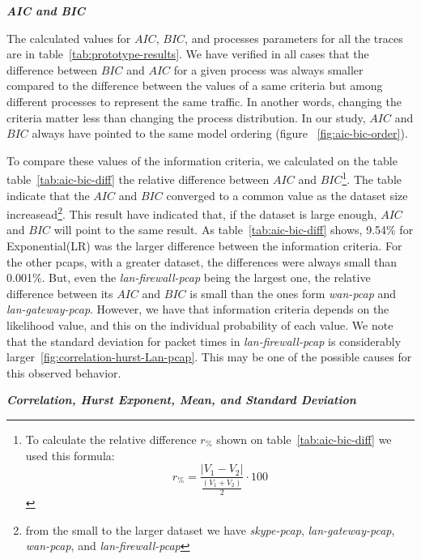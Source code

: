 \smallskip \noindent  \textbf{\textit{AIC and BIC}}

The calculated values for $AIC$, $BIC$, and processes parameters for all the traces are in table~\ref{tab:prototype-results}. We have verified in all cases  that the difference between $BIC$ and $AIC$ for a given process was always smaller compared to the difference between the values of a same criteria but among different processes to represent the same traffic. In another words, changing the criteria matter less than changing the process distribution. In our study,  $AIC$ and $BIC$ always have pointed to the same model ordering (figure ~\ref{fig:aic-bic-order}).

To compare these values of the information criteria, we calculated on the table  table~\ref{tab:aic-bic-diff} the relative difference between $AIC$ and $BIC$\footnote{ 
To calculate the relative difference $r_\%$ shown on table~\ref{tab:aic-bic-diff} we used this formula:
\begin{equation}
    r_\% = \frac{|V_1-V_2|}{\frac{(V_1+V_2)}{2}}\cdot100 
\end{equation}
}. The table indicate that the $AIC$ and $BIC$ converged to a common value as  the dataset size increasead\footnote{from the small to the larger dataset we have \textit{skype-pcap}, \textit{lan-gateway-pcap}, \textit{wan-pcap}, and \textit{lan-firewall-pcap}}. 
This result have indicated that, if the dataset is large enough, $AIC$ and $BIC$ will point to the same result. As table~\ref{tab:aic-bic-diff} shows, 9.54\% for Exponential(LR) was the larger difference between the information criteria. For the other pcaps, with a greater dataset, the differences were always small than 0.001\%. But, even the \textit{lan-firewall-pcap} being the largest one, the relative difference between its $AIC$ and $BIC$ is small than the ones form \textit{wan-pcap} and \textit{lan-gateway-pcap}. However, we have that information criteria depends on the likelihood value, and this on the individual probability of each value. We note that the standard deviation for packet times in \textit{lan-firewall-pcap} is considerably larger~\ref{fig:correlation-hurst-Lan-pcap}. This may be one of the possible causes for this observed behavior.



\smallskip \noindent  \textbf{\textit{Correlation, Hurst Exponent, Mean, and Standard Deviation}} 

